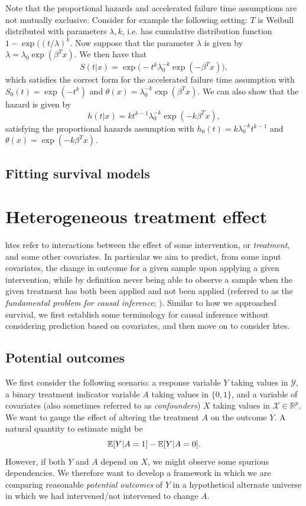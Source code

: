 \documentclass[../thesis.tex]{subfiles}
\begin{document}
Note that the proportional hazards and accelerated failure time assumptions are not mutually exclusive. Consider for example the following setting: $T$ is Weibull distributed with parameters $\lambda, k$, i.e. has cumulative distribution function $1- \exp((t/\lambda)^k$. Now suppose that the parameter $\lambda$ is given by $\lambda = \lambda_0 \exp(\beta^T x)$. We then have that 
\[S(t|x) = \exp\big(-t^k\lambda_0^{-k}\exp( -\beta^Tx)\big), \]
which satisfies the correct form for the accelerated failure time assumption with $S_0(t) = \exp(-t^k)$ and $\theta(x) = \lambda_0^{-k}\exp(\beta^Tx)$. We can also show that the hazard is given by 
\[h(t|x) = kt^{k-1}\lambda_0^{-k} \exp(-k\beta^Tx), \]
satisfying the proportional hazards assumption with $h_0(t) = k\lambda_0^{-k}t^{k-1}$ and $\theta(x) = \exp(-k\beta^Tx)$. 

\subsection{Fitting survival models}

\section{Heterogeneous treatment effect \label{sec:hte}}
\Glspl{hte} refer to interactions between the effect of some intervention, or \emph{treatment}, and some other covariates. In particular we aim to predict, from some input covariates, the change in outcome for a given sample upon applying a given intervention, while by definition never being able to observe a sample when the given treatment has both been applied and not been applied (referred to as the \emph{fundamental problem for causal inference}; \citealp{holland_statistics_1986}). Similar to how we approached survival, we first establish some terminology for causal inference without considering prediction based on covariates, and then move on to consider \glspl{hte}.

\subsection{Potential outcomes}
We first consider the following scenario: a response variable $Y$ taking values in $\mathcal{Y}$, a binary treatment indicator variable $A$ taking values in $\{0,1\}$, and a variable of covariates (also sometimes referred to as \emph{confounders}) $X$ taking values in $\mathcal{X} \in \mathbb{R}^p$. We want to gauge the effect of altering the treatment $A$ on the outcome $Y$. A natural quantity to estimate might be
\[\mathbb{E}[Y | A = 1] - \mathbb{E}[Y | A = 0].\]
However, if both $Y$ and $A$ depend on $X$, we might observe some spurious dependencies. We therefore want to develop a framework in which we are comparing reasonable \emph{potential outcomes} of $Y$ in a hypothetical alternate universe in which we had intervened/not intervened to change $A$.
\end{document}
